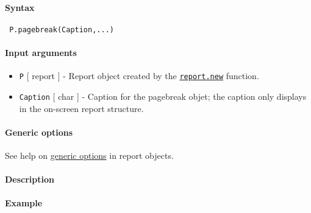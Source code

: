 


	\paragraph{Syntax}
 
 \begin{verbatim}
 P.pagebreak(Caption,...)
 \end{verbatim}
 
 \paragraph{Input arguments}
 
 \begin{itemize}
 \item
   \texttt{P} {[} report {]} - Report object created by the
   \href{report/new}{\texttt{report.new}} function.
 \item
   \texttt{Caption} {[} char {]} - Caption for the pagebreak objet; the
   caption only displays in the on-screen report structure.
 \end{itemize}
 
 \paragraph{Generic options}
 
 See help on \href{report/Contents}{generic options} in report objects.
 
 \paragraph{Description}
 
 \paragraph{Example}



